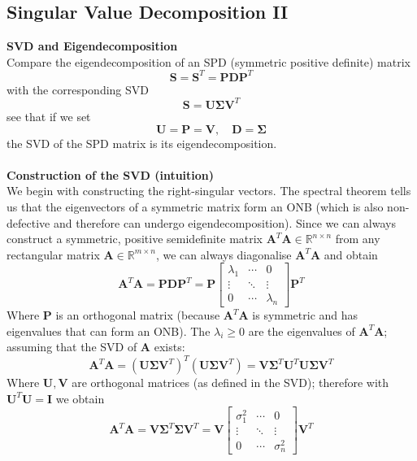 \documentclass{report}
\begin{document}
\subsection{Singular Value Decomposition II} %
\textbf{SVD and Eigendecomposition}\\
Compare the eigendecomposition of an SPD (symmetric positive definite) matrix
\begin{equation*}
\bm{S}=\bm{S}^T=\bm{PDP}^T
\end{equation*}
with the corresponding SVD
\begin{equation*}
\bm{S}=\bm{U\Sigma V}^T
\end{equation*}
see that if we set
\begin{equation*}
\bm{U}=\bm{P}=\bm{V},\quad\bm{D}=\bm{\Sigma} 
\end{equation*}
the SVD of the SPD matrix is its eigendecomposition.\\
\vspace{1mm}\\
\textbf{Construction of the SVD (intuition)}\\
We begin with constructing the right-singular vectors. The spectral theorem tells us that the eigenvectors of a
symmetric matrix form an ONB (which is also non-defective and therefore can undergo eigendecomposition). 
Since we can always construct a symmetric, positive semidefinite matrix $\bm{A}^T\bm{A}\in\mathbb{R}^{n\times n}$ 
from any rectangular matrix $\bm{A}\in\mathbb{R}^{m\times n}$, we can always diagonalise
$\bm{A}^T\bm{A}$ and obtain
\begin{equation*}
\bm{A}^T\bm{A}=\bm{PDP}^T=\bm{P}\begin{bmatrix}
\lambda_1&\cdots&0\\\vdots&\ddots&\vdots\\0&\cdots
&\lambda_n
\end{bmatrix}\bm{P}^T
\end{equation*}
Where $\bm{P}$ is an orthogonal matrix (because $\bm{A}^T\bm{A}$ is symmetric and has eigenvalues that can form
an ONB). The $\lambda_i\geq0$ are the eigenvalues of $\bm{A}^T\bm{A}$; assuming that the SVD of $\bm{A}$
exists:
\begin{equation*}
\bm{A}^T\bm{A}=(\bm{U}\bm{\Sigma}\bm{V}^T)^T(\bm{U}\bm{\Sigma}\bm{V}^T)
=\bm{V}\bm{\Sigma}^T\bm{U}^T\bm{U}\bm{\Sigma}\bm{V}^T
\end{equation*}
Where $\bm{U},\bm{V}$ are orthogonal matrices (as defined in the SVD); therefore with $\bm{U}^T\bm{U}=\bm{I}$ we
obtain
\begin{equation*}
\bm{A}^T\bm{A}=\bm{V}\bm{\Sigma}^T\bm{\Sigma}\bm{V}^T
=\bm{V}\begin{bmatrix}
\sigma^2_1&\cdots&0\\\vdots&\ddots&\vdots\\0&\cdots&
\sigma^2_n
\end{bmatrix}\bm{V}^T
\end{equation*}
\end{document}
